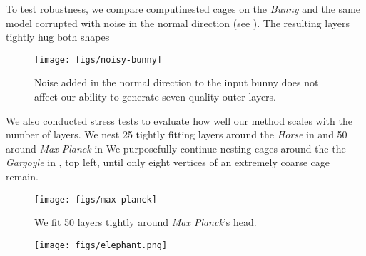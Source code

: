 %
%

To test robustness, we compare computinested cages on the \emph{Bunny}
and the same model corrupted with noise in the normal direction (see
). The resulting layers tightly hug both shapes

\begin{figure}
  \texttt{[image: figs/noisy-bunny]}
  \caption{Noise added in the normal direction to the input bunny does not
  affect our ability to generate seven quality outer layers.}
  \label{fig:noisy-bunny}
\end{figure}

We also conducted stress tests to evaluate how well our method scales with the
number of layers. We nest 25 tightly fitting layers around the \emph{Horse} in
\newhl{,} and 50 around \emph{Max Planck} in 
%
We purposefully continue nesting cages around the the \emph{Gargoyle} in
, top left, until only eight vertices of an extremely coarse
cage remain.


\begin{figure}
  \texttt{[image: figs/max-planck]}
  \caption{ We fit 50 layers tightly around \emph{Max Planck}'s head.}
  \label{fig:max-planck}
\end{figure}

\begin{figure}
  \texttt{[image: figs/elephant.png]}
  \caption{}
  \label{fig:elephants}
\end{figure}

